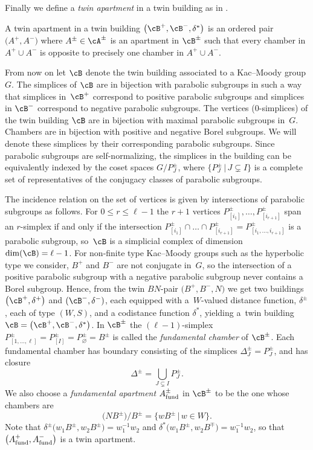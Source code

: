 Finally we define a {\it twin apartment} in a twin building as in \cite[Definition~5.171]{AbramenkoBrown08}.
\begin{Definition}\label{definition:Twin_Apartment}
A twin apartment in a twin building $\big(\cB^+, \cB^-, \delta^*\big)$ is an ordered pair $\big(A^+, A^-\big)$ where $A^\pm\in \cA^\pm$ is an apartment in $\cB^\pm$ such that every chamber in $A^+\cup A^-$ is opposite to precisely one chamber in $A^+\cup A^-$.
\end{Definition}

From now on let $\cB$ denote the twin building associated to a Kac--Moody group $G$.
The simplices of $\cB$ are in bijection with parabolic subgroups in such a way that simplices in~$\cB^+$ correspond to positive parabolic subgroups and simplices in $\cB^-$ correspond to negative parabolic subgroups. The vertices ($0$-simplices) of the twin building $\cB$ are in bijection with maximal parabolic subgroups in~$G$. Chambers are in bijection with positive and negative Borel subgroups.
 We will denote these simplices by their corresponding parabolic subgroups.
Since parabolic subgroups are self-normalizing, the simplices in the building can be equivalently indexed by the coset spaces $G/P_J^\pm$, where $\big\{P_{J}^\pm\, |\, J\subsetneq I\big\}$ is a complete set of representatives of the conjugacy classes of parabolic subgroups.

The incidence relation on the set of vertices is given by intersections of parabolic subgroups as follows. For $0\leq r\leq \ell-1$ the $r+1$ vertices $P_{[i_1]}^\pm,\dots , P_{[i_{r+1}]}^\pm$ span an $r$-simplex if and only if the intersection
$P_{[i_1]}^\pm\cap \dots \cap P_{[i_{r+1}]}^\pm = P_{[i_{1},\dots, i_{r+1}]}^\pm$ is a parabolic subgroup, so~$\cB$ is a simplicial complex of dimension $ \dim(\cB) =\ell -1$.
For non-finite type Kac--Moody groups such as the hyperbolic type we consider, $B^+$ and $B^-$ are not conjugate in~$G$, so the intersection of a positive parabolic subgroup with a negative parabolic subgroup never contains a Borel subgroup.
Hence, from the twin $BN$-pair $\big(B^+,B^-,N\big)$ we get two buildings $\big(\cB^+,\delta^+\big)$ and $(\cB^-,\delta^-)$, each equipped with a~$W$-valued distance function, $\delta^\pm$,
each of type $(W,S)$, and a codistance function $\delta^*$, yielding a~twin building $\cB=\big(\cB^+, \cB^-, \delta^*\big)$. In $\cB^\pm$ the $(\ell-1)$-simplex $P_{[1,\dots, {\ell}]}^\pm = P_{[I]}^\pm = P_\varnothing^\pm = B^\pm$ is called the {\em fundamental chamber} of $\cB^\pm$. Each fundamental chamber has boundary consisting of the simplices $\Delta_J^\pm = P_J^\pm$, and has closure
\[\Delta^\pm = \bigcup_{J\subsetneq I} P_J^\pm.\]
We also choose a {\it fundamental apartment} $A^\pm_{\rm fund}$ in $\cB^\pm$ to be the one whose chambers are
\[\big(NB^\pm\big)/B^\pm = \big\{wB^\pm\,|\, w\in W\big\}.\]
Note that $\delta^\pm\big(w_1B^\pm,w_2B^\pm\big) = w_1^{-1} w_2$ and $\delta^*\big(w_1B^\pm,w_2B^\mp\big) = w_1^{-1} w_2$, so that $\big(A^+_{\rm fund},A^-_{\rm fund}\big)$ is a twin apartment.

